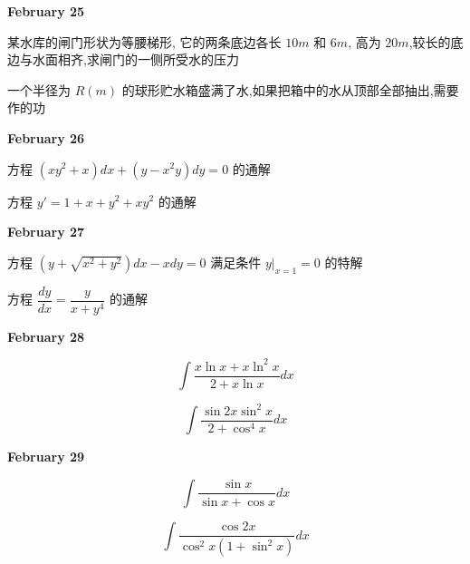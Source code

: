 \textcolor{purplea}{\textbf{February 25}}

\begin{example}[][Exam: 28.4.7]
	某水库的闸门形状为等腰梯形, 它的两条底边各长 $10m$ 和 $6m$, 高为 $20m$,较长的底边与水面相齐,求闸门的一侧所受水的压力
\end{example}

\begin{example}[][Exam: 28.4.8]
	一个半径为 $R(m)$ 的球形贮水箱盛满了水,如果把箱中的水从顶部全部抽出,需要作的功
\end{example}

\textcolor{purplea}{\textbf{February 26}}

\begin{example}[][Exam: 28.4.9]
	方程 $(xy^{2}+x)dx+(y-x^{2}y)dy=0$ 的通解
\end{example}

\begin{example}[][Exam: 28.4.10]
	方程 $y'=1+x+y^{2}+xy^{2}$ 的通解
\end{example}

\textcolor{purplea}{\textbf{February 27}}

\begin{example}[][Exam: 28.4.11]
	方程 $(y+\sqrt{x^{2}+y^{2}})dx-xdy=0$ 满足条件 $y|_{x=1}=0$ 的特解
\end{example}

\begin{example}[][Exam: 28.4.12]
	方程 $\dfrac{dy}{dx}=\dfrac{y}{x+y^{4}}$ 的通解
\end{example}

\textcolor{purplea}{\textbf{February 28}}

\begin{example}[][Exam: 28.4.13]
	$$\int\dfrac{x\ln x+x\ln^{2}x}{2+x\ln x}dx$$
\end{example}

\begin{example}[][Exam: 28.4.14]
	$$\int\dfrac{\sin 2x\sin^{2}x}{2+\cos^{4} x}dx$$
\end{example}

\textcolor{purplea}{\textbf{February 29}}
\begin{example}[][Exam: 28.4.15]
	$$\int\dfrac{\sin x}{\sin x+\cos x}dx$$
\end{example}

\begin{example}[][Exam: 28.4.16]
	$$\int\dfrac{\cos 2x}{\cos^{2} x(1+\sin^{2} x)}dx$$
\end{example}


